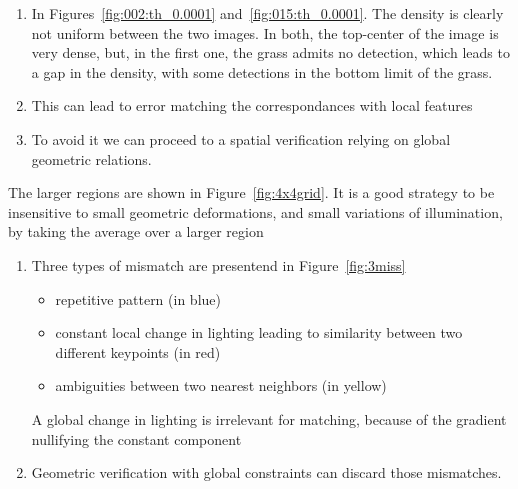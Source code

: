 \documentclass{article}
\begin{document}
\begin{enumerate}
	\item In Figures~\ref{fig:002:th_0.0001} and~\ref{fig:015:th_0.0001}. The density is clearly not uniform between the two images. In both, the top-center of the image is very dense, but, in the first one, the grass admits no detection, which leads to a gap in the density, with some detections in the bottom limit of the grass.
	\item This can lead to error matching the correspondances with local features
	\item To avoid it we can proceed to a spatial verification relying on global geometric relations.
\end{enumerate}



The larger regions are shown in Figure~\ref{fig:4x4grid}. It is a good strategy to be insensitive to small geometric deformations, and small variations of illumination, by taking the average over a larger region



\begin{enumerate}
	\item Three types of mismatch are presentend in Figure~\ref{fig:3miss} \begin{itemize}
		      \item repetitive pattern (in blue)
		      \item constant local change in lighting leading to similarity between two different keypoints (in red)
		      \item ambiguities between two nearest neighbors (in yellow)
	      \end{itemize}
	      A global change in lighting is irrelevant for matching, because of the gradient nullifying the constant component
	\item Geometric verification with global constraints can discard those mismatches.
\end{enumerate}
\end{document}
